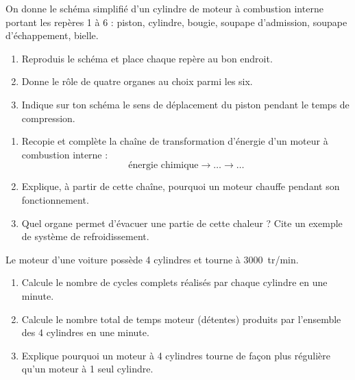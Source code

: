 \documentclass[11pt]{article}
\newcounter{popsec}
\newcounter{popsub}
\newcommand{\courssub}[1]{%
  \stepcounter{popsub}%
  \par\vspace{9pt}\noindent{\popxbold\fontsize{11.5}{13}\selectfont\color{popink}{\color{poporange}\thepopsec.\thepopsub}\hspace{6pt}#1}\par\nopagebreak\vspace{4pt}
}
\begin{document}
\begin{exercice}
On donne le schéma simplifié d'un cylindre de moteur à combustion interne portant les repères 1 à 6 : piston, cylindre, bougie, soupape d'admission, soupape d'échappement, bielle.
\begin{enumerate}
\item Reproduis le schéma et place chaque repère au bon endroit.
\item Donne le rôle de quatre organes au choix parmi les six.
\item Indique sur ton schéma le sens de déplacement du piston pendant le temps de compression.
\end{enumerate}
\end{exercice}

\begin{exercice}
\begin{enumerate}
\item Recopie et complète la chaîne de transformation d'énergie d'un moteur à combustion interne :
\[
\text{énergie chimique} \longrightarrow \ldots \longrightarrow \ldots
\]
\item Explique, à partir de cette chaîne, pourquoi un moteur chauffe pendant son fonctionnement.
\item Quel organe permet d'évacuer une partie de cette chaleur ? Cite un exemple de système de refroidissement.
\end{enumerate}
\end{exercice}

\begin{exercice}
Le moteur d'une voiture possède 4 cylindres et tourne à \SI{3000}{tr/min}.
\begin{enumerate}
\item Calcule le nombre de cycles complets réalisés par chaque cylindre en une minute.
\item Calcule le nombre total de temps moteur (détentes) produits par l'ensemble des 4 cylindres en une minute.
\item Explique pourquoi un moteur à 4 cylindres tourne de façon plus régulière qu'un moteur à 1 seul cylindre.
\end{enumerate}
\end{exercice}

\courssub{Je me prépare au Bac}
\end{document}
